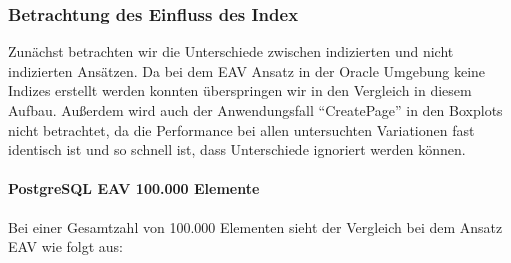 \subsubsection*{Betrachtung des Einfluss des Index}


Zunächst betrachten wir die Unterschiede zwischen indizierten und nicht indizierten Ansätzen. Da bei dem EAV Ansatz in der Oracle Umgebung keine Indizes erstellt werden konnten überspringen wir in den Vergleich in diesem Aufbau. Außerdem wird auch der Anwendungsfall ``CreatePage'' in den Boxplots nicht betrachtet, da die Performance bei allen untersuchten Variationen fast identisch ist und so schnell ist, dass Unterschiede ignoriert werden können.

\paragraph*{PostgreSQL EAV 100.000 Elemente}
Bei einer Gesamtzahl von 100.000 Elementen sieht der Vergleich bei dem Ansatz EAV wie folgt aus:





